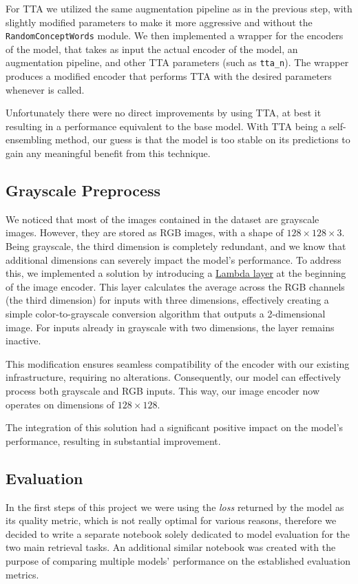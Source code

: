 \documentclass[10pt,twocolumn,letterpaper]{article}
\begin{document}
For TTA we utilized the same augmentation pipeline as in the previous step, with slightly modified parameters to make it more aggressive and without the \texttt{RandomConceptWords} module.
We then implemented a wrapper for the encoders of the model, that takes as input the actual encoder of the model, an augmentation pipeline, and other TTA parameters (such as \texttt{tta\_n}). The wrapper produces a modified encoder that performs TTA with the desired parameters whenever is called.

Unfortunately there were no direct improvements by using TTA, at best it resulting in a performance equivalent to the base model.
With TTA being a self-ensembling method, our guess is that the model is too stable on its predictions to gain any meaningful benefit from this technique.

\subsection{Grayscale Preprocess}
We noticed that most of the images contained in the dataset are grayscale images. However, they are stored as RGB images, with a shape of $ 128 \times 128 \times 3 $. Being grayscale, the third dimension is completely redundant, and we know that additional dimensions can severely impact the model's performance. To address this, we implemented a solution by introducing a \href{https://www.tensorflow.org/api_docs/python/tf/keras/layers/Lambda}{Lambda layer} at the beginning of the image encoder. This layer calculates the average across the RGB channels (the third dimension) for inputs with three dimensions, effectively creating a simple color-to-grayscale conversion algorithm that outputs a 2-dimensional image. For inputs already in grayscale with two dimensions, the layer remains inactive.

This modification ensures seamless compatibility of the encoder with our existing infrastructure, requiring no alterations. Consequently, our model can effectively process both grayscale and RGB inputs. This way, our image encoder now operates on dimensions of $128 \times 128$.

The integration of this solution had a significant positive impact on the model's performance, resulting in substantial improvement.

\subsection{Evaluation}
In the first steps of this project we were using the \textit{loss} returned by the model as its quality metric, which is not really optimal for various reasons, therefore we decided to write a separate notebook solely dedicated to model evaluation for the two main retrieval tasks.
An additional similar notebook was created with the purpose of comparing multiple models' performance on the established evaluation metrics.
\end{document}
